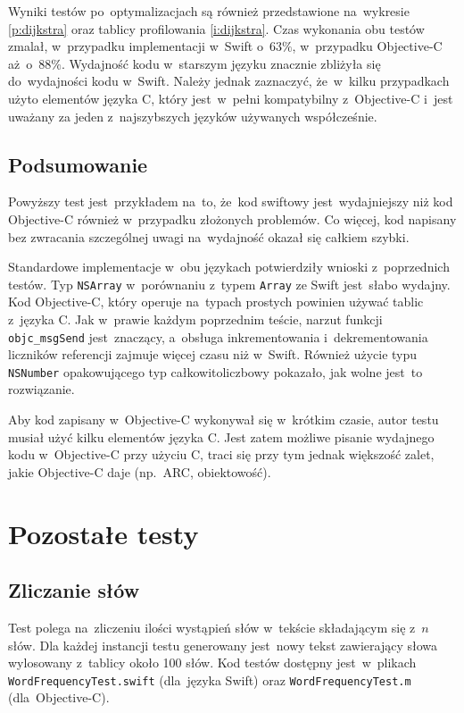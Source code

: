 \documentclass[mgr, shortabstract]{iithesis}
\newcommand{\swiftinline}[1]{
    \texttt{#1}
}
\newcommand{\objcinline}[1]{
    \texttt{#1}
}
\begin{document}
Wyniki testów po~optymalizacjach są również przedstawione na~wykresie \ref{p:dijkstra} oraz tablicy profilowania \ref{i:dijkstra}. Czas wykonania obu testów zmalał, w~przypadku implementacji w~Swift o~$63\%$, w~przypadku Objective-C aż~o~$88\%$. Wydajność kodu w~starszym języku znacznie zbliżyła się do~wydajności kodu w~Swift. Należy jednak zaznaczyć, że~w~kilku przypadkach użyto elementów języka C, który jest~w~pełni kompatybilny z~Objective-C i~jest uważany za jeden z~najszybszych języków używanych współcześnie.

\subsection{Podsumowanie}

Powyższy test jest~przykładem na~to, że~kod swiftowy jest~wydajniejszy niż kod Objective-C również w~przypadku złożonych problemów. Co więcej, kod napisany bez zwracania szczególnej uwagi na~wydajność okazał się całkiem szybki.

Standardowe implementacje w~obu językach potwierdziły wnioski z~poprzednich testów. Typ \objcinline{NSArray} w~porównaniu z~typem \swiftinline{Array} ze Swift jest~słabo wydajny. Kod Objective-C, który operuje na~typach prostych powinien używać tablic z~języka C. Jak w~prawie każdym poprzednim teście, narzut funkcji \swiftinline{objc_msgSend} jest~znaczący, a~obsługa inkrementowania i~dekrementowania liczników referencji zajmuje więcej czasu niż w~Swift. Również użycie typu \objcinline{NSNumber} opakowującego typ całkowitoliczbowy pokazało, jak wolne jest~to rozwiązanie.

Aby kod zapisany w~Objective-C wykonywał się w~krótkim czasie, autor testu musiał użyć kilku elementów języka C. Jest zatem możliwe pisanie wydajnego kodu w~Objective-C przy użyciu C, traci się przy tym jednak większość zalet, jakie Objective-C daje (np.~ARC, obiektowość).

\section{Pozostałe testy}

\subsection{Zliczanie słów}

Test polega na~zliczeniu ilości wystąpień słów w~tekście składającym się z~$n$ słów. Dla każdej instancji testu generowany jest~nowy tekst zawierający słowa wylosowany z~tablicy około 100 słów. Kod testów dostępny jest~w~plikach \texttt{WordFrequencyTest.swift} (dla~języka Swift) oraz \texttt{WordFrequencyTest.m} (dla~Objective-C).
\end{document}
